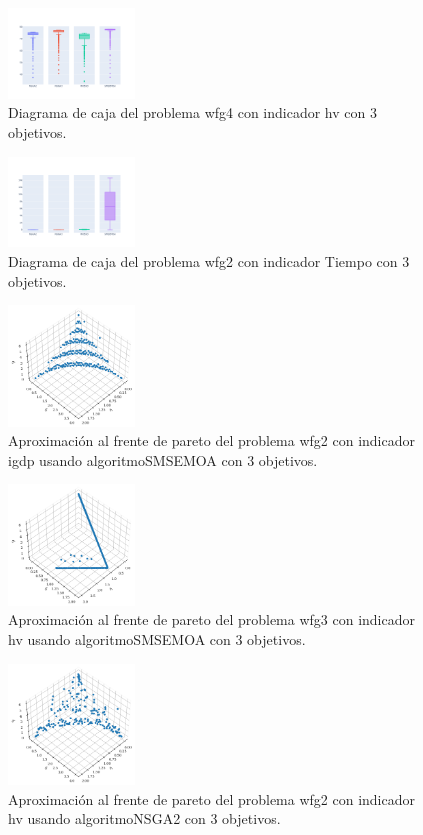 \documentclass{article}
\begin{document}
\clearpage
\begin{figure}
	\includegraphics[width=0.3\textwidth]{wfg4_hv_3_bp.png}
	\caption{Diagrama de caja del problema wfg4 con indicador hv con 3 objetivos.}
\end{figure}
\begin{figure}
	\includegraphics[width=0.3\textwidth]{wfg2_Tiempo_3_bp.png}
	\caption{Diagrama de caja del problema wfg2 con indicador Tiempo con 3 objetivos.}
\end{figure}
\begin{figure}
	\includegraphics[width=0.3\textwidth]{SMSEMOA_wfg2_igdp_3_fp.png}
	\caption{Aproximación al frente de pareto del problema wfg2 con indicador igdp usando algoritmoSMSEMOA con 3 objetivos.}
\end{figure}
\clearpage
\begin{figure}
	\includegraphics[width=0.3\textwidth]{SMSEMOA_wfg3_hv_3_fp.png}
	\caption{Aproximación al frente de pareto del problema wfg3 con indicador hv usando algoritmoSMSEMOA con 3 objetivos.}
\end{figure}
\begin{figure}
	\includegraphics[width=0.3\textwidth]{NSGA2_wfg2_hv_3_fp.png}
	\caption{Aproximación al frente de pareto del problema wfg2 con indicador hv usando algoritmoNSGA2 con 3 objetivos.}
\end{figure}
\end{document}
